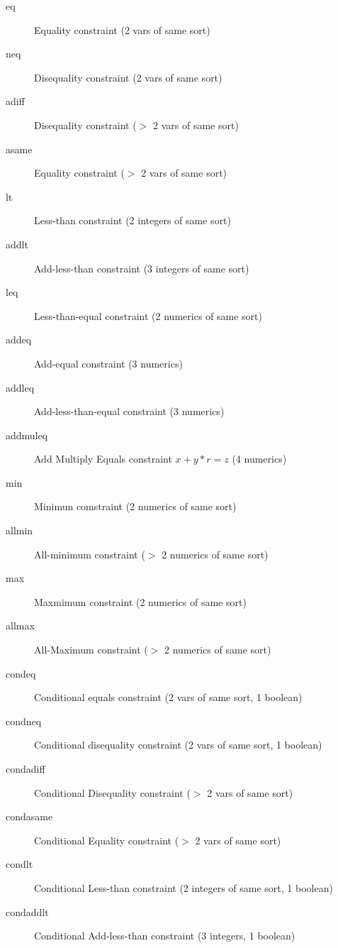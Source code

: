 \begin{description}
\item[eq]{Equality constraint (2 vars of same sort)}
\item[neq]{Disequality constraint (2 vars of same sort)}
\item[adiff]{Disequality constraint ($>$ 2  vars of same sort)}
\item[asame]{Equality constraint ($>$ 2 vars of same sort)}

\item[lt]{Less-than constraint (2 integers of same sort)}
\item[addlt]{Add-less-than constraint (3 integers of same sort)}

\item[leq]{Less-than-equal constraint (2 numerics of same sort)}
\item[addeq]{Add-equal constraint (3 numerics)}
\item[addleq]{Add-less-than-equal constraint (3 numerics)}

\item[addmuleq]{Add Multiply Equals constraint $x+y*r=z$  (4 numerics)}

\item[min]{Minimun comstraint (2 numerics of same sort)}
\item[allmin]{All-minimum constraint ($>$ 2 numerics of same sort)}

\item[max]{Maxmimum constraint (2 numerics of same sort)}
\item[allmax]{All-Maximum constraint ($>$ 2 numerics of same sort)}

\item[condeq]{Conditional equals constraint (2 vars of same sort, 1 boolean)}
\item[condneq]{Conditional disequality constraint (2 vars of same sort, 1 boolean)}
\item[condadiff]{Conditional Disequality constraint ($>$ 2 vars of same sort)}
\item[condasame]{Conditional Equality constraint ($>$ 2 vars of same sort)}

\item[condlt]{Conditional Less-than constraint (2 integers of same sort, 1 boolean)}
\item[condaddlt]{Conditional Add-less-than constraint (3 integers, 1 boolean)}


\end{description}

